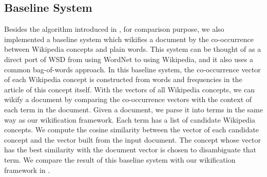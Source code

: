 \subsection{Baseline System}
Besides the algorithm introduced in ,
for comparison purpose,
we also implemented a baseline system which wikifies a document by the
co-occurrence between Wikipedia concepts and plain words.
This system can be thought of as a direct port of WSD from using WordNet to
using Wikipedia, and it also uses a common bag-of-words approach.
In this baseline system, the co-occurrence vector of
each Wikipedia concept is constructed
from words and frequencies in the article of this concept itself.
With the vectors of all Wikipedia concepts,
we can wikify a document by comparing the co-occurrence vectors with
the context of each term in the document. Given a document, we parse it
into terms in the same way as our wikification framework.
Each term has a list of candidate Wikipedia concepts.
We compute the cosine similarity
between the vector of each candidate concept and the vector built from
the input document. The concept whose vector has the best similarity with
the document vector is chosen to disambiguate that
term. We compare the result of this baseline system with
our wikification framework in .

%
